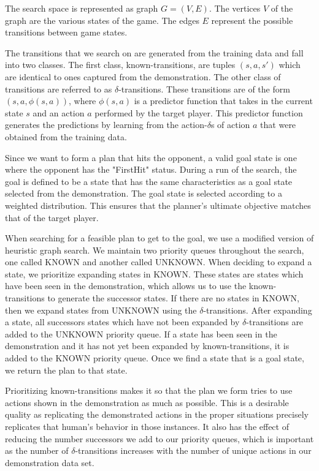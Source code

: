 The search space is represented as graph $G = (V, E)$. The vertices $V$ of the graph are the various states of the game. The edges $E$ represent the possible transitions between game states. 

The transitions that we search on are generated from the training data and fall into two classes. The first class, known-transitions, are tuples $(s,a,s')$ which are identical to ones captured from the demonstration. The other class of transitions are referred to as $\delta$-transitions. These transitions are of the form $(s, a, \phi(s, a))$, where $\phi(s, a)$ is a predictor function that takes in the current state $s$ and an action $a$ performed by the target player. This predictor function generates the predictions by learning from the action-$\delta$s of action $a$ that were obtained from the training data.

Since we want to form a plan that hits the opponent, a valid goal state is one where the opponent has the "FirstHit" status. During a run of the search, the goal is defined to be a state that has the same characteristics as a goal state selected from the demonstration. The goal state is selected according to a weighted distribution. This ensures that the planner's ultimate objective matches that of the target player.

When searching for a feasible plan to get to the goal, we use a modified version of heuristic graph search. We maintain two priority queues throughout the search, one called KNOWN and another called UNKNOWN. When deciding to expand a state, we prioritize expanding states in KNOWN. These states are states which have been seen in the demonstration, which allows us to use the known-transitions to generate the successor states. If there are no states in KNOWN, then we expand states from UNKNOWN using the $\delta$-transitions. After expanding a state, all successors states which have not been expanded by $\delta$-transitions are added to the UNKNOWN priority queue. If a state has been seen in the demonstration and it has not yet been expanded by known-transitions, it is added to the KNOWN priority queue. Once we find a state that is a goal state, we return the plan to that state.

Prioritizing known-transitions makes it so that the plan we form tries to use actions shown in the demonstration as much as possible. This is a desirable quality as replicating the demonstrated actions in the proper situations precisely replicates that human's behavior in those instances. It also has the effect of reducing the number successors we add to our priority queues, which is important as the number of $\delta$-transitions increases with the number of unique actions in our demonstration data set.

